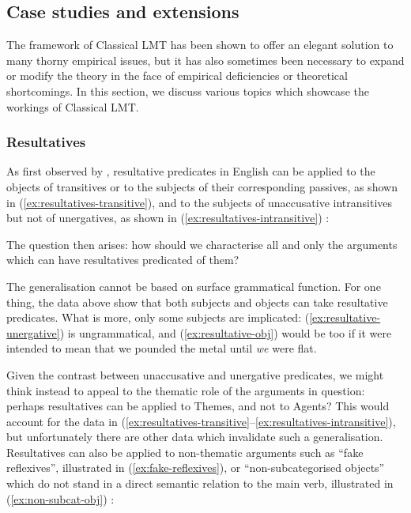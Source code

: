 \documentclass[output=paper]{langscibook}
\begin{document}
\subsection{Case studies and extensions}\label{sec:argstr:lmt-case-studies}


The framework of Classical LMT has been shown to offer an elegant solution to
many thorny empirical issues, but it has also sometimes been necessary to expand
or modify the theory in the face of empirical deficiencies or theoretical
shortcomings. In this section, we discuss various topics which showcase the
workings of Classical LMT.

\subsubsection{Resultatives}

As first observed by \citet{simpson1983resultatives}, resultative predicates in
English can be applied to the objects of transitives or to the subjects of their
corresponding passives, as shown in (\ref{ex:resultatives-transitive}), and to
the subjects of unaccusative intransitives but not of unergatives, as shown in
(\ref{ex:resultatives-intransitive}) \citep[examples from][46]{bresnanzaenen90}:

\ea \label{ex:resultatives-transitive}
\label{ex:resultative-obj}
\label{ex:resultative-passive}
\z
\z
\ea\label{ex:resultatives-intransitive}
\label{ex:resultative-unaccusative}
\label{ex:resultative-unergative}
\z
\z
%
The question then arises: how should we characterise all and only the arguments
which can have resultatives predicated of them?

The generalisation cannot be based on surface grammatical function. For one
thing, the data above show that both subjects and objects can take resultative
predicates. What is more, only some subjects are implicated:
(\ref{ex:resultative-unergative}) is ungrammatical, and
(\ref{ex:resultative-obj}) would be too if it were intended to mean that we
pounded the metal until \emph{we} were flat.

Given the contrast between unaccusative and unergative predicates, we might
think instead to appeal to the thematic role of the arguments in question:
perhaps resultatives can be applied to Themes, and not to Agents? This would
account for the data in
(\ref{ex:resultatives-transitive}--\ref{ex:resultatives-intransitive}), but
unfortunately there are other data which invalidate such a generalisation.
Resultatives can also be applied to non-thematic arguments such as ``fake
reflexives'', illustrated in (\ref{ex:fake-reflexives}), or ``non-subcategorised
objects'' which do not stand in a direct semantic relation to the main verb,
illustrated in (\ref{ex:non-subcat-obj}) \citep[examples
from][47]{bresnanzaenen90}:
\end{document}
